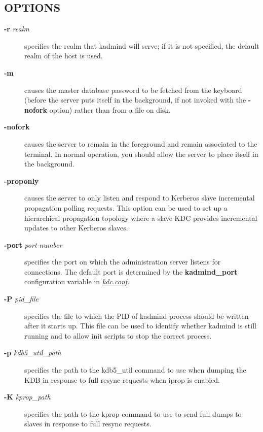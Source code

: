 \documentclass[letterpaper,10pt,english]{sphinxmanual}
\begin{document}
\subsection{OPTIONS}
\label{admin/admin_commands/kadmind:options}\begin{description}
\item[{\textbf{-r} \emph{realm}}] \leavevmode
specifies the realm that kadmind will serve; if it is not
specified, the default realm of the host is used.

\item[{\textbf{-m}}] \leavevmode
causes the master database password to be fetched from the
keyboard (before the server puts itself in the background, if not
invoked with the \textbf{-nofork} option) rather than from a file on
disk.

\item[{\textbf{-nofork}}] \leavevmode
causes the server to remain in the foreground and remain
associated to the terminal.  In normal operation, you should allow
the server to place itself in the background.

\item[{\textbf{-proponly}}] \leavevmode
causes the server to only listen and respond to Kerberos slave
incremental propagation polling requests.  This option can be used
to set up a hierarchical propagation topology where a slave KDC
provides incremental updates to other Kerberos slaves.

\item[{\textbf{-port} \emph{port-number}}] \leavevmode
specifies the port on which the administration server listens for
connections.  The default port is determined by the
\textbf{kadmind\_port} configuration variable in {\hyperref[admin/conf_files/kdc_conf:kdc-conf-5]{\emph{kdc.conf}}}.

\item[{\textbf{-P} \emph{pid\_file}}] \leavevmode
specifies the file to which the PID of kadmind process should be
written after it starts up.  This file can be used to identify
whether kadmind is still running and to allow init scripts to stop
the correct process.

\item[{\textbf{-p} \emph{kdb5\_util\_path}}] \leavevmode
specifies the path to the kdb5\_util command to use when dumping the
KDB in response to full resync requests when iprop is enabled.

\item[{\textbf{-K} \emph{kprop\_path}}] \leavevmode
specifies the path to the kprop command to use to send full dumps
to slaves in response to full resync requests.


\end{description}
\end{document}

